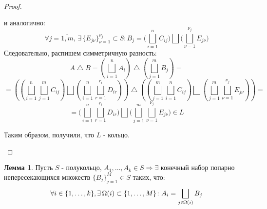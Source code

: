 \documentclass[12pt]{article}
\theoremstyle{definition}
\newtheorem{lemma}{Лемма}
\newcommand{\smallerrel}[1]{\mathrel{\mathpalette\smallerrelaux{#1}}}
\newcommand{\smallerrelaux}[2]{\raisebox{.1ex}{\scalebox{.75}{$#1#2$}}}
\newcommand{\smallin}{\smallerrel{\in}}
\begin{document}
\begin{proof}
\begin{enumerate}[label={\arabic*)}]
\begin{enumerate}[label={(\arabic*)}]
			и аналогично: 
			$$
				\forall j = \overline{1,m},\, \exists \, \{E_{j\nu}\}_{\nu = 1}^{\nu_j} \subset S \colon B_j = \Big(\bigsqcup\limits_{i=1}^{n} C_{ij} \Big) \bigsqcup \Big(\bigsqcup\limits_{\nu=1}^{\nu_j} E_{j\nu}\Big) 
			$$
			Следовательно, распишем симметричную разность:
			$$ 
				A \bigtriangleup B  = \left( \bigsqcup\limits_{i=1}^{n} A_i\right) \bigtriangleup \left( \bigsqcup\limits_{j=1}^{m} B_j\right) = 				
			$$
			$$
				= \left(\left(
				\bigsqcup\limits_{i=1}^n \bigsqcup\limits_{j =1}^{m} C_{ij}
				\right) \bigsqcup \left(
				\bigsqcup\limits_{i=1}^n \bigsqcup\limits_{r =1}^{r_i} D_{ir}
				\right)\right)
				\bigtriangleup			
				\left(\left(
				\bigsqcup\limits_{j=1}^m \bigsqcup\limits_{i =1}^{n} C_{ij}
				\right) \bigsqcup \left(
				\bigsqcup\limits_{j=1}^m \bigsqcup\limits_{\nu = 1}^{\nu_j} E_{j\nu}
				\right)\right) = 
			$$
			$$
				= \Big(
				\bigsqcup\limits_{i=1}^n \bigsqcup\limits_{r =1}^{r_i} D_{ir}
				\Big)
				\bigsqcup			
				\Big(
				\bigsqcup\limits_{j=1}^m \bigsqcup\limits_{\nu = 1}^{\nu_j} E_{j\nu}
				\Big) \in L
			$$		
		\end{enumerate}
		Таким образом, получили, что $L$ - кольцо.
	\end{enumerate}
\end{proof}

\begin{lemma}
	Пусть $S$ - полукольцо, $A_1, \dotsc, A_k \in S \Rightarrow \exists$ конечный набор попарно непересекающихся множеств $\{B_j\}_{j = 1}^{M} \in S$ таких, что:
	$$
		\forall i \in \{1,\dotsc,k\}, \exists \, \Omega(i) \subset \{1,\dotsc, M\} \colon A_i = \bigsqcup\limits_{j \smallin \Omega(i)} B_j
	$$
\end{lemma}
\end{document}
